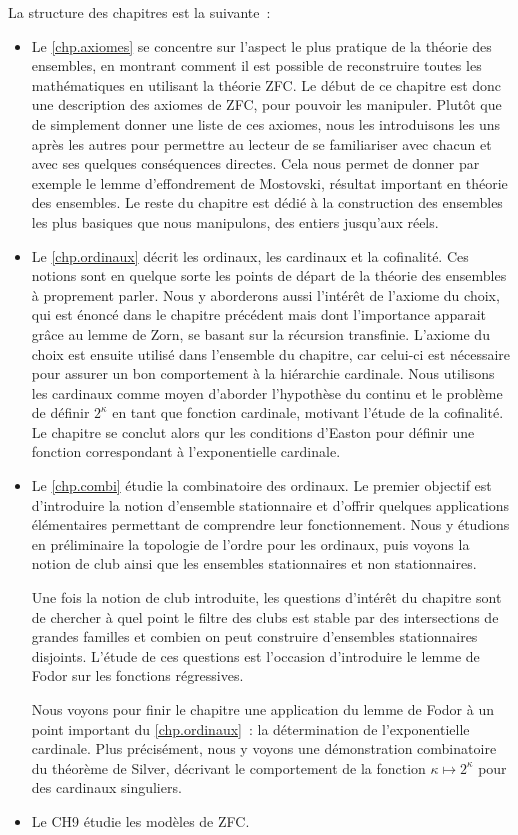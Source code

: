 La structure des chapitres est la suivante~:
\begin{itemize}
\item Le \cref{chp.axiomes} se concentre sur l'aspect le plus pratique de la
  théorie des ensembles, en montrant comment il est possible de reconstruire
  toutes les mathématiques en utilisant la théorie ZFC. Le début de ce chapitre
  est donc une description des axiomes de ZFC, pour pouvoir les manipuler.
  Plutôt que de simplement donner une liste de ces axiomes, nous les
  introduisons les uns après les autres pour permettre au lecteur de se
  familiariser avec chacun et avec ses quelques conséquences directes. Cela nous
  permet de donner par exemple le lemme d'effondrement de Mostovski, résultat
  important en théorie des ensembles. Le reste du chapitre est dédié à la
  construction des ensembles les plus basiques que nous manipulons, des entiers
  jusqu'aux réels.
\item Le \cref{chp.ordinaux} décrit les ordinaux, les cardinaux et la
  cofinalité. Ces notions sont en quelque sorte les points de départ de la
  théorie des ensembles à proprement parler. Nous y aborderons aussi l'intérêt
  de l'axiome du choix, qui est énoncé dans le chapitre précédent mais dont
  l'importance apparait grâce au lemme de Zorn, se basant sur la récursion
  transfinie. L'axiome du choix est ensuite utilisé dans l'ensemble du chapitre,
  car celui-ci est nécessaire pour assurer un bon comportement à la hiérarchie
  cardinale. Nous utilisons les cardinaux comme moyen d'aborder l'hypothèse du
  continu et le problème de définir $2^\kappa$ en tant que fonction cardinale,
  motivant l'étude de la cofinalité. Le chapitre se conclut alors qur les
  conditions d'Easton pour définir une fonction correspondant à l'exponentielle
  cardinale.
\item Le \cref{chp.combi} étudie la combinatoire des ordinaux. Le premier
  objectif est d'introduire la notion d'ensemble stationnaire et d'offrir
  quelques applications élémentaires permettant de comprendre leur
  fonctionnement. Nous y étudions en préliminaire la topologie de l'ordre pour
  les ordinaux, puis voyons la notion de club ainsi que les ensembles
  stationnaires et non stationnaires.

  Une fois la notion de club introduite, les questions d'intérêt du chapitre
  sont de chercher à quel point le filtre des clubs est stable par des
  intersections de grandes familles et combien on peut construire d'ensembles
  stationnaires disjoints. L'étude de ces questions est l'occasion d'introduire
  le lemme de Fodor sur les fonctions régressives.

  Nous voyons pour finir le chapitre une application du lemme de Fodor à un
  point important du \cref{chp.ordinaux}~: la détermination de l'exponentielle
  cardinale. Plus précisément, nous y voyons une démonstration combinatoire du
  théorème de Silver, décrivant le comportement de la fonction
  $\kappa\mapsto 2^\kappa$ pour des cardinaux singuliers.
\item Le CH9 étudie les modèles de ZFC.
\end{itemize}

